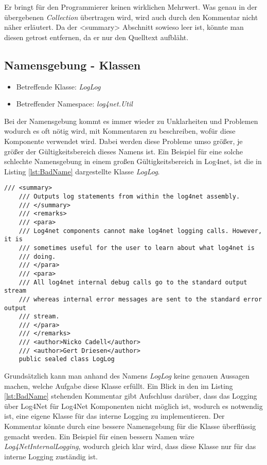 Er bringt für den Programmierer keinen wirklichen Mehrwert. Was genau in der übergebenen \textit{Collection} übertragen wird, wird auch durch den Kommentar nicht näher erläutert. Da der <summary> Abschnitt sowieso leer ist, könnte man diesen getrost entfernen, da er nur den Quelltext aufbläht. 

\subsection{Namensgebung - Klassen}
\begin{itemize}
	\item Betreffende Klasse: \textit{LogLog}
	\item Betreffender Namespace: \textit{log4net.Util}
\end{itemize}

Bei der Namensgebung kommt es immer wieder zu Unklarheiten und Problemen wodurch es oft nötig wird, mit Kommentaren zu beschreiben, wofür diese Komponente verwendet wird. Dabei werden diese Probleme umso größer, je größer der Gültigkeitsbereich dieses Namens ist. Ein Beispiel für eine solche schlechte Namensgebung in einem großen Gültigkeitsbereich in Log4net, ist die in Listing \ref{lst:BadName} dargestellte Klasse \textit{LogLog}. 

\begin{lstlisting}[language={[Sharp]C}, caption=Beispiele für schlechte Namensgebung, label=lst:BadName]
/// <summary>
	/// Outputs log statements from within the log4net assembly.
	/// </summary>
	/// <remarks>
	/// <para>
	/// Log4net components cannot make log4net logging calls. However, it is
	/// sometimes useful for the user to learn about what log4net is
	/// doing.
	/// </para>
	/// <para>
	/// All log4net internal debug calls go to the standard output stream
	/// whereas internal error messages are sent to the standard error output 
	/// stream.
	/// </para>
	/// </remarks>
	/// <author>Nicko Cadell</author>
	/// <author>Gert Driesen</author>
	public sealed class LogLog
\end{lstlisting}

Grundsätzlich kann man anhand des Namens \textit{LogLog} keine genauen Aussagen machen, welche Aufgabe diese Klasse erfüllt. Ein Blick in den im Listing \ref{lst:BadName} stehenden Kommentar gibt Aufschluss darüber, dass das Logging über Log4Net für Log4Net Komponenten nicht möglich ist, wodurch es notwendig ist, eine eigene Klasse für das interne Logging zu implementieren. Der Kommentar könnte durch eine bessere Namensgebung für die Klasse überflüssig gemacht werden. Ein Beispiel für einen bessern Namen wäre \textit{Log4NetInternalLogging}, wodurch gleich klar wird, dass diese Klasse nur für das interne Logging zuständig ist. 

